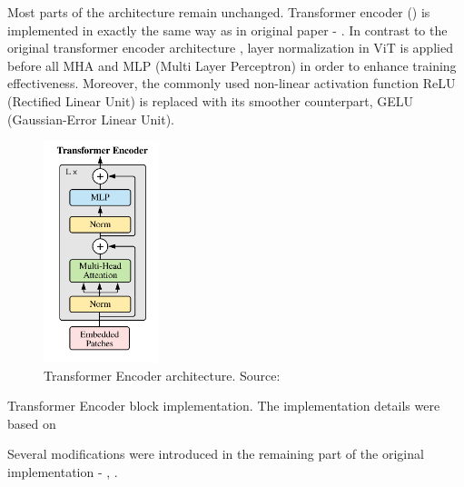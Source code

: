 Most parts of the architecture remain unchanged.
Transformer encoder () is implemented in exactly the same way as in original paper - .
In contrast to the original transformer encoder architecture \cite{Vaswani2017}, layer normalization in ViT is applied before all MHA and MLP (Multi Layer Perceptron) in order to enhance training effectiveness.
Moreover, the commonly used non-linear activation function ReLU (Rectified Linear Unit) is replaced with its smoother counterpart, GELU (Gaussian-Error Linear Unit).

\begin{figure}[H] 
  \centering     
  \includegraphics[width=0.3\textwidth]{img/transformer-encoder.png} 
  \caption{Transformer Encoder architecture. Source: \cite{vitPaper}}
  \label{fig:transformer-encoder}
\end{figure}

\newenvironment{longlistingA}{\captionsetup{type=listing, width=0.8\textwidth}}{}
\begin{longlistingA}
    \caption{Transformer Encoder block implementation. The implementation details were based on \cite{d2lViT}}
    \label{lst:transformer_encoder}
\end{longlistingA}
\vspace{12pt}

Several modifications were introduced in the remaining part of the original implementation - , .

